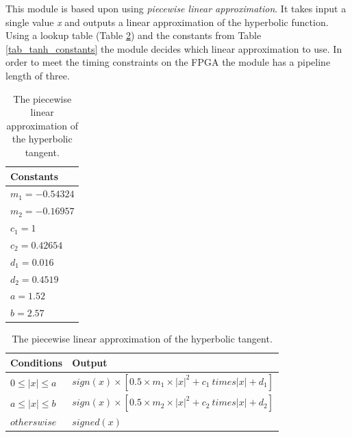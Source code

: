 This module is based upon \cite{Lin2008} using \textit{piecewise linear approximation}. It takes input a single value \textit{x} and outputs a linear approximation of the hyperbolic function. Using a lookup table (Table \ref{tab_tanh}) and the constants from Table \ref{tab_tanh_constants} the module decides which linear approximation to use. 
In order to meet the timing constraints on the FPGA the module has a pipeline length of three. 

\begin{table}
	\centering
    \begin{tabular}{| >{\centering\arraybackslash}m{1.2in} |} 
    \hline
    Constants \\ \hline
    $ m_1 = -0.54324 $ \\ \hline
    $ m_2 = -0.16957 $ \\ \hline
    $ c_1 = 1 $ \\ \hline
    $ c_2 = 0.42654 $ \\ \hline
    $ d_1 = 0.016 $ \\ \hline
    $ d_2 = 0.4519 $ \\ \hline
    $ a = 1.52 $ \\ \hline
    $ b = 2.57 $ \\ \hline
        \end{tabular}
    \caption{The constant used for the hyperbolic tangent approximation.}
   	\label{tab_tanh_constants}
    
    
	\centering
    \begin{tabular}{| >{\centering\arraybackslash}m{1.2in} | >{\centering\arraybackslash}m{2.5in} |} 
    \hline
    Conditions & Output \\ \hline
    $ 0 \le |x| \le a $ & $ sign(x) \times [0.5 \times m_1 \times |x|^2 + c_1 \ times |x| + d_1] $\\ \hline
    $ a \le |x| \le b $ & $ sign(x) \times [0.5 \times m_2 \times |x|^2 + c_2 \ times |x| + d_2] $\\ \hline
   	$ otherswise $ & $ signed(x) $\\ \hline
        \end{tabular}
    \caption{The piecewise linear approximation of the hyperbolic tangent.}
   	\label{tab_tanh}
    
\end{table}

\vspace*{1\baselineskip}


